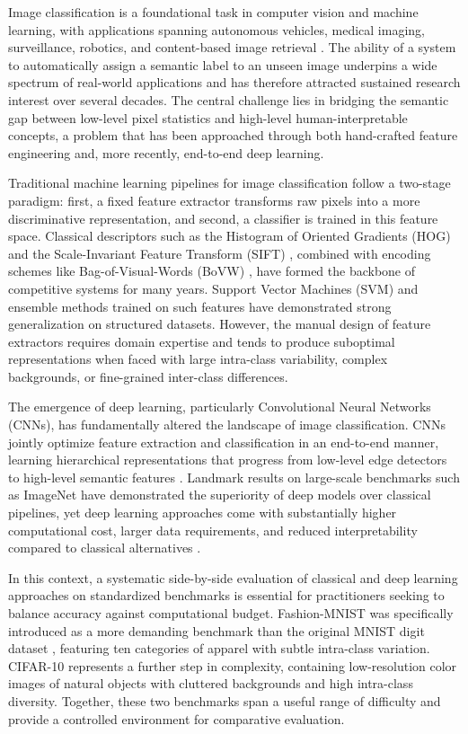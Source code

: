 \documentclass[conference]{IEEEtran}
\begin{document}
Image classification is a foundational task in computer vision and machine learning, with applications spanning autonomous vehicles, medical imaging, surveillance, robotics, and content-based image retrieval \cite{lecun1998mnist}. The ability of a system to automatically assign a semantic label to an unseen image underpins a wide spectrum of real-world applications and has therefore attracted sustained research interest over several decades. The central challenge lies in bridging the semantic gap between low-level pixel statistics and high-level human-interpretable concepts, a problem that has been approached through both hand-crafted feature engineering and, more recently, end-to-end deep learning.

Traditional machine learning pipelines for image classification follow a two-stage paradigm: first, a fixed feature extractor transforms raw pixels into a more discriminative representation, and second, a classifier is trained in this feature space. Classical descriptors such as the Histogram of Oriented Gradients (HOG) \cite{dalal2005histograms} and the Scale-Invariant Feature Transform (SIFT) \cite{lowe2004distinctive}, combined with encoding schemes like Bag-of-Visual-Words (BoVW) \cite{csurka2004visual}, have formed the backbone of competitive systems for many years. Support Vector Machines (SVM) \cite{cortes1995support} and ensemble methods trained on such features have demonstrated strong generalization on structured datasets. However, the manual design of feature extractors requires domain expertise and tends to produce suboptimal representations when faced with large intra-class variability, complex backgrounds, or fine-grained inter-class differences.

The emergence of deep learning, particularly Convolutional Neural Networks (CNNs), has fundamentally altered the landscape of image classification. CNNs jointly optimize feature extraction and classification in an end-to-end manner, learning hierarchical representations that progress from low-level edge detectors to high-level semantic features \cite{paszke2019pytorch}. Landmark results on large-scale benchmarks such as ImageNet have demonstrated the superiority of deep models over classical pipelines, yet deep learning approaches come with substantially higher computational cost, larger data requirements, and reduced interpretability compared to classical alternatives \cite{pedregosa2011scikit}.

In this context, a systematic side-by-side evaluation of classical and deep learning approaches on standardized benchmarks is essential for practitioners seeking to balance accuracy against computational budget. Fashion-MNIST \cite{xiao2017fashionmnist} was specifically introduced as a more demanding benchmark than the original MNIST digit dataset \cite{lecun1998mnist}, featuring ten categories of apparel with subtle intra-class variation. CIFAR-10 \cite{krizhevsky2009learning} represents a further step in complexity, containing low-resolution color images of natural objects with cluttered backgrounds and high intra-class diversity. Together, these two benchmarks span a useful range of difficulty and provide a controlled environment for comparative evaluation.
\end{document}

